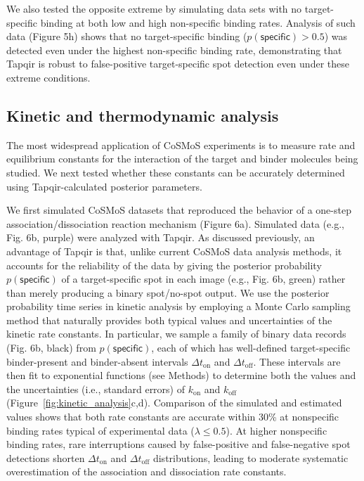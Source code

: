 We also tested the opposite extreme by simulating data sets with no target-specific binding at both low and high non-specific binding rates. Analysis of such data  (Figure 5h) shows that no target-specific binding ($p(\mathsf{specific}) > 0.5$) was detected even under the highest non-specific binding rate, demonstrating that Tapqir is robust to false-positive target-specific spot detection even under these extreme conditions. 

\subsection*{Kinetic and thermodynamic analysis}

The most widespread application of CoSMoS experiments is to measure rate and equilibrium constants for the interaction of the target and binder molecules being studied.  We next tested whether these constants can be accurately determined using Tapqir-calculated posterior parameters. 

We first simulated CoSMoS datasets that reproduced the behavior of a one-step association/dissociation reaction mechanism (Figure 6a). Simulated data (e.g., Fig. 6b, purple) were analyzed with Tapqir.   As discussed previously, an advantage of Tapqir is that, unlike current CoSMoS data analysis methods, it accounts for the reliability of the data by giving the posterior probability $p(\mathsf{specific})$ of a target-specific spot in each image (e.g., Fig. 6b, green) rather than merely producing a binary spot/no-spot output.  We use the posterior probability time series in kinetic analysis by employing a Monte Carlo sampling method that naturally provides both typical values and uncertainties of the kinetic rate constants.  In particular, we sample a family of binary data records (Fig. 6b, black) from $p(\mathsf{specific})$, each of which has well-defined target-specific binder-present and binder-absent intervals $\Delta t_\mathrm{on}$ and $\Delta t_\mathrm{off}$. These intervals are then fit to exponential functions (see Methods) to determine both the values and the uncertainties (i.e., standard errors) of $k_\mathrm{on}$ and $k_\mathrm{off}$ (Figure~\ref{fig:kinetic_analysis}c,d). Comparison of the simulated and estimated values shows that both rate constants are accurate within 30\% at nonspecific binding rates typical of experimental data ($\lambda \leq 0.5$). At higher nonspecific binding rates, rare interruptions caused by false-positive and false-negative spot detections shorten $\Delta t_\mathrm{on}$ and $\Delta t_\mathrm{off}$ distributions, leading to moderate systematic overestimation of the association and dissociation rate constants.

